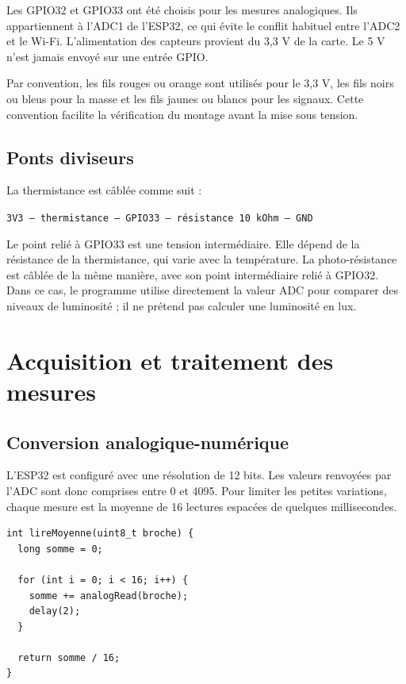 \documentclass[12pt,a4paper]{report}
\begin{document}
Les GPIO32 et GPIO33 ont été choisis pour les mesures analogiques. Ils
appartiennent à l'ADC1 de l'ESP32, ce qui évite le conflit habituel entre
l'ADC2 et le Wi-Fi. L'alimentation des capteurs provient du 3,3 V de la carte.
Le 5 V n'est jamais envoyé sur une entrée GPIO.

Par convention, les fils rouges ou orange sont utilisés pour le 3,3 V, les
fils noirs ou bleus pour la masse et les fils jaunes ou blancs pour les
signaux. Cette convention facilite la vérification du montage avant la mise
sous tension.

\subsection{Ponts diviseurs}

La thermistance est câblée comme suit :

\begin{center}
\texttt{3V3 -- thermistance -- GPIO33 -- résistance 10 kOhm -- GND}
\end{center}

Le point relié à GPIO33 est une tension intermédiaire. Elle dépend de la
résistance de la thermistance, qui varie avec la température. La
photo-résistance est câblée de la même manière, avec son point intermédiaire
relié à GPIO32. Dans ce cas, le programme utilise directement la valeur ADC
pour comparer des niveaux de luminosité ; il ne prétend pas calculer une
luminosité en lux.

\section{Acquisition et traitement des mesures}

\subsection{Conversion analogique-numérique}

L'ESP32 est configuré avec une résolution de 12 bits. Les valeurs renvoyées
par l'ADC sont donc comprises entre 0 et 4095. Pour limiter les petites
variations, chaque mesure est la moyenne de 16 lectures espacées de quelques
millisecondes.

\begin{lstlisting}[style=code,caption={Moyenne de plusieurs lectures ADC}]
int lireMoyenne(uint8_t broche) {
  long somme = 0;

  for (int i = 0; i < 16; i++) {
    somme += analogRead(broche);
    delay(2);
  }

  return somme / 16;
}
\end{lstlisting}
\end{document}
